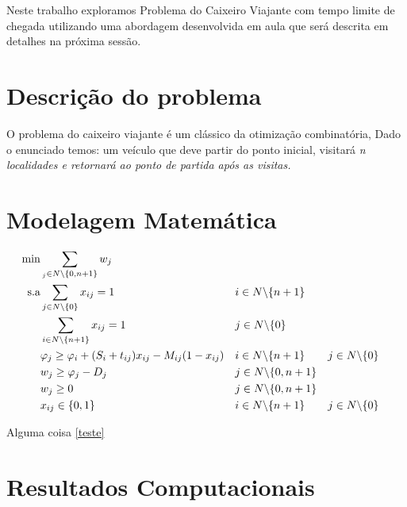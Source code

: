 \documentclass[12pt]{article}
\begin{document}
Neste trabalho exploramos Problema do Caixeiro Viajante com tempo limite de chegada utilizando uma abordagem desenvolvida em aula que será descrita em detalhes na próxima sessão.



\section{Descrição do problema}

O problema do caixeiro viajante é um clássico da otimização combinatória, 
Dado o enunciado temos: um veículo que deve partir do ponto inicial, visitará \it{n} localidades e retornará ao ponto de partida após as visitas.



\section{Modelagem Matemática}

\begin{align}
  \min       & \sum_{_j\in N\backslash \{0,n+1\}} w_j                             & \label{teste}                                                          \\
  \hbox{s.a} & \sum_{j\in N\backslash \{0\}} x_{ij} = 1                           &               & i\in N\backslash \{n+1\}                               \\
             & \sum_{i\in N\backslash \{n+1\}} x_{ij} = 1                         &               & j\in N\backslash \{0\}                                 \\
             & \varphi_j \geq \varphi_i + (S_i + t_{ij})x_{ij} - M_{ij}(1-x_{ij}) &               & i\in N\backslash \{n+1\}   &  & j\in N\backslash \{0\} \\
             & w_j \geq \varphi_j - D_j                                           &               & j\in N\backslash \{0,n+1\}                             \\
             & w_j \geq 0                                                         &               & j\in N\backslash \{0,n+1\}                             \\
             & x_{ij} \in \{0,1\}                                                 &               & i\in N\backslash \{n+1\}   &  & j\in N\backslash \{0\}
\end{align}

Alguma coisa \eqref{teste}

\section{Resultados Computacionais}
\end{document}
